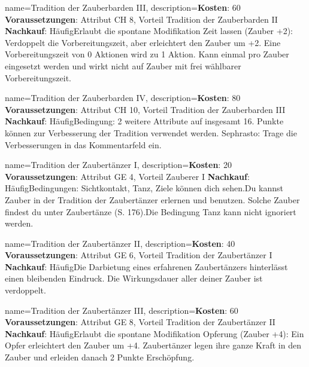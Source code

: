 {
    name={Tradition der Zauberbarden III},
    description={\textbf{Kosten}: 60 \textbf{Voraussetzungen}: Attribut CH 8, Vorteil Tradition der Zauberbarden II \textbf{Nachkauf}: Häufig\newline Erlaubt die spontane Modifikation Zeit lassen (Zauber +2): Verdoppelt die Vorbereitungszeit, aber erleichtert den Zauber um +2. Eine Vorbereitungszeit von 0 Aktionen wird zu 1 Aktion. Kann einmal pro Zauber eingesetzt werden und wirkt nicht auf Zauber mit frei wählbarer Vorbereitungszeit.}
}


{
    name={Tradition der Zauberbarden IV},
    description={\textbf{Kosten}: 80 \textbf{Voraussetzungen}: Attribut CH 10, Vorteil Tradition der Zauberbarden III \textbf{Nachkauf}: Häufig\newline Bedingung: 2 weitere Attribute auf insgesamt 16. Punkte können zur Verbesserung der Tradition verwendet werden. Sephrasto: Trage die Verbesserungen in das Kommentarfeld ein.}
}


{
    name={Tradition der Zaubertänzer I},
    description={\textbf{Kosten}: 20 \textbf{Voraussetzungen}: Attribut GE 4, Vorteil Zauberer I \textbf{Nachkauf}: Häufig\newline Bedingungen: Sichtkontakt, Tanz, Ziele können dich sehen.\newline Du kannst Zauber in der Tradition der Zaubertänzer erlernen und benutzen. Solche Zauber findest du unter Zaubertänze (S. 176).\newline Die Bedingung Tanz kann nicht ignoriert werden.}
}


{
    name={Tradition der Zaubertänzer II},
    description={\textbf{Kosten}: 40 \textbf{Voraussetzungen}: Attribut GE 6, Vorteil Tradition der Zaubertänzer I \textbf{Nachkauf}: Häufig\newline Die Darbietung eines erfahrenen Zaubertänzers hinterlässt einen bleibenden Eindruck. Die Wirkungsdauer aller deiner Zauber ist verdoppelt.}
}


{
    name={Tradition der Zaubertänzer III},
    description={\textbf{Kosten}: 60 \textbf{Voraussetzungen}: Attribut GE 8, Vorteil Tradition der Zaubertänzer II \textbf{Nachkauf}: Häufig\newline Erlaubt die spontane Modifikation Opferung (Zauber +4): Ein Opfer erleichtert den Zauber um +4. Zaubertänzer legen ihre ganze Kraft in den Zauber und erleiden danach 2 Punkte Erschöpfung.}
}



